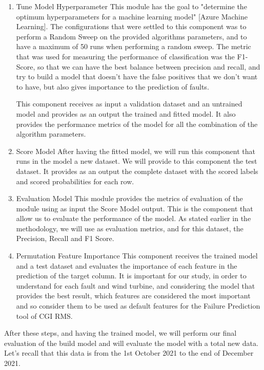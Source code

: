 \begin{enumerate}
    \item{Tune Model Hyperparameter}
This module has the goal to "determine the optimum hyperparameters for a machine learning model" [Azure Machine Learning]. The configurations that were settled to this component was to perform a Random Sweep on the provided algorithms parameters, and to have a maximum of 50 runs when performing a random sweep. The metric that was used for measuring the performance of classification was the F1-Score, so that we can have the best balance between precision and recall, and try to build a model that doesn't have the false positives that we don't want to have, but also gives importance to the prediction of faults.

This component receives as input a validation dataset and an untrained model and provides as an output the trained and fitted model. It also provides the performance metrics of the model for all the combination of the algorithm parameters.

    \item{Score Model}
After having the fitted model, we will run this component that runs in the model a new dataset. We will provide to this component the test dataset. It provides as an output the complete dataset with the scored labels and scored probabilities for each row.
    
    \item{Evaluation Model}
This module provides the metrics of evaluation of the module using as input the Score Model output. This is the component that allow us to evaluate the performance of the model. As stated earlier in the methodology, we will use as evaluation metrics, and for this dataset, the Precision, Recall and F1 Score.
    
    \item{Permutation Feature Importance}
This component receives the trained model and a test dataset and evaluates the importance of each feature in the prediction of the target column.
It is important for our study, in order to understand for each fault and wind turbine, and considering the model that provides the best result, which features are considered the most important and so consider them to be used as default features for the Failure Prediction tool of CGI RMS.
\end{enumerate}

After these steps, and having the trained model, we will perform our final evaluation of the build model and will evaluate the model with a total new data. Let's recall that this data is from the 1st October 2021 to the end of December 2021.

